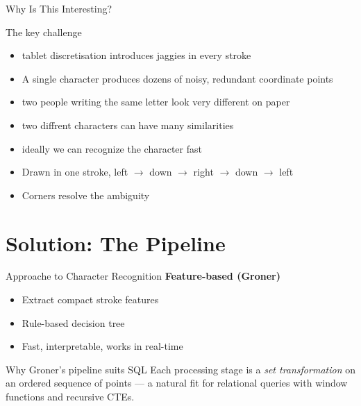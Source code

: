 \documentclass[aspectratio=169, 12pt]{beamer}
\begin{document}
\begin{frame}{Why Is This Interesting?}
  \begin{block}{The key challenge}
    \begin{itemize}
      \item tablet discretisation introduces jaggies in every stroke
      \item A single character produces dozens of noisy, redundant coordinate
    points
    \item two people writing the same letter look very different
    on paper
    \item two diffrent characters can have many similarities
    \item ideally we can recognize the character fast
    \end{itemize}
  \end{block}

  \bigskip
  \begin{example}
    \begin{itemize}
      \item Drawn in one stroke, left $\to$ down $\to$ right $\to$ down $\to$ left
      \item Corners resolve the ambiguity
    \end{itemize}
  \end{example}
\end{frame}

\section{Solution: The Pipeline}

\begin{frame}{Approache to Character Recognition}
  \textbf{Feature-based (Groner)}
  \begin{itemize}
    \item Extract compact stroke features
    \item Rule-based decision tree
    \item Fast, interpretable, works in real-time
  \end{itemize}

  \bigskip
  \begin{alertblock}{Why Groner's pipeline suits SQL}
    Each processing stage is a \emph{set transformation} on an ordered
    sequence of points — a natural fit for relational queries with
    window functions and recursive CTEs.
  \end{alertblock}
\end{frame}
\end{document}
